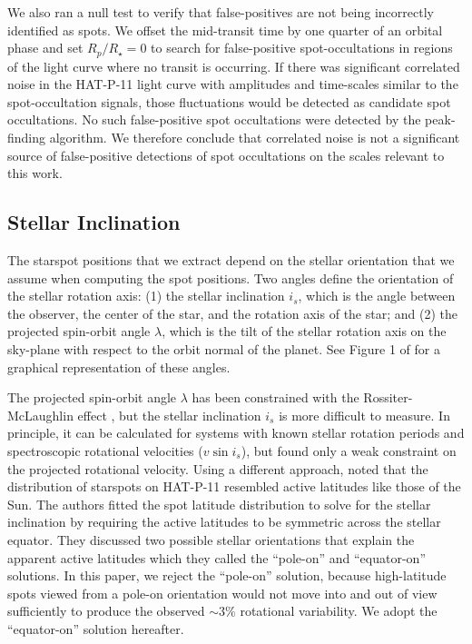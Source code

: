 We also ran a null test to verify that false-positives are not being incorrectly identified as spots. We offset the mid-transit time by one quarter of an orbital phase and set $R_p/R_\star = 0$ to search for false-positive spot-occultations in regions of the light curve where no transit is occurring. If there was significant correlated noise in the HAT-P-11 light curve with amplitudes and time-scales similar to the spot-occultation signals, those fluctuations would be detected as candidate spot occultations. No such false-positive spot occultations were detected by the peak-finding algorithm. We therefore conclude that correlated noise is not a significant source of false-positive detections of spot occultations on the scales relevant to this work.

\subsection{Stellar Inclination} \label{sec:i_s}

The starspot positions that we extract depend on the stellar orientation that we assume when computing the spot positions. Two angles define the orientation of the stellar rotation axis: (1) the stellar inclination $i_s$, which is the angle between the observer, the center of the star, and the rotation axis of the star; and (2) the projected spin-orbit angle $\lambda$, which is the tilt of the stellar rotation axis on the sky-plane with respect to the orbit normal of the planet. See Figure 1 of \citet{Fabrycky2009} for a graphical representation of these angles. 

The projected spin-orbit angle $\lambda$ has been constrained with the Rossiter-McLaughlin effect \citep{Winn2010, Hirano2011}, but the stellar inclination $i_s$ is more difficult to measure. In principle, it can be calculated for systems with known stellar rotation periods and spectroscopic rotational velocities ($v \sin i_s$), but \citet{bakos2010} found only a weak constraint on the projected rotational velocity. 
Using a different approach, \citet{Sanchis-Ojeda2011} noted that the distribution of starspots on HAT-P-11 resembled active latitudes like those of the Sun. The authors fitted the spot latitude distribution to solve for the stellar inclination by requiring the active latitudes to be symmetric across the stellar equator. They discussed two possible stellar orientations that explain the apparent active latitudes which they called the ``pole-on'' and ``equator-on'' solutions. In this paper, we reject the ``pole-on'' solution, because high-latitude spots viewed from a pole-on orientation would not move into and out of view sufficiently to produce the observed $\sim 3$\% rotational variability. We adopt the ``equator-on'' solution hereafter.

